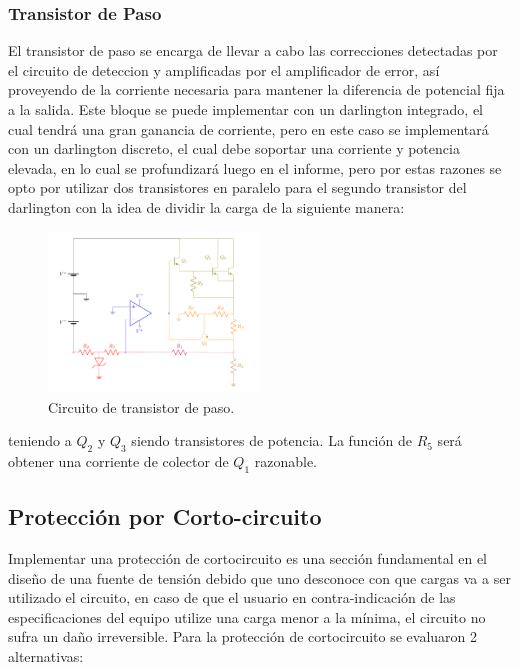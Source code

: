 \subsubsection{Transistor de Paso}
El transistor de paso se encarga de llevar a cabo las correcciones detectadas por el circuito de deteccion y amplificadas por el amplificador de error, así proveyendo de la corriente necesaria para mantener la diferencia de potencial fija a la salida. Este bloque se puede implementar con un darlington integrado, el cual tendrá una gran ganancia de corriente, pero en este caso se implementará con un darlington discreto, el cual debe soportar una corriente y potencia elevada, en lo cual se profundizará luego en el informe, pero por estas razones se opto por utilizar dos transistores en paralelo para el segundo transistor del darlington con la idea de dividir la carga de la siguiente manera:
\begin{figure}[H]
\centering
	\includegraphics[width=0.5\textwidth, page=5]{ImagenesEjercicio2/Regulador.pdf}
	\caption{Circuito de transistor de paso.}
	\label{fig:transistorDePaso}
\end{figure}
teniendo a $Q_2$ y $Q_3$ siendo transistores de potencia.
La función de $R_5$ será obtener una corriente de colector de $Q_1$ razonable.
\subsection{Protección por Corto-circuito}
Implementar una protección de cortocircuito es una sección fundamental en el diseño de una fuente de tensión debido que uno desconoce con que cargas va  a ser utilizado el circuito, en caso de que el usuario en contra-indicación de las especificaciones del equipo utilize una carga menor a la mínima, el circuito no sufra un daño irreversible. 
Para la protección de cortocircuito se evaluaron 2 alternativas:
